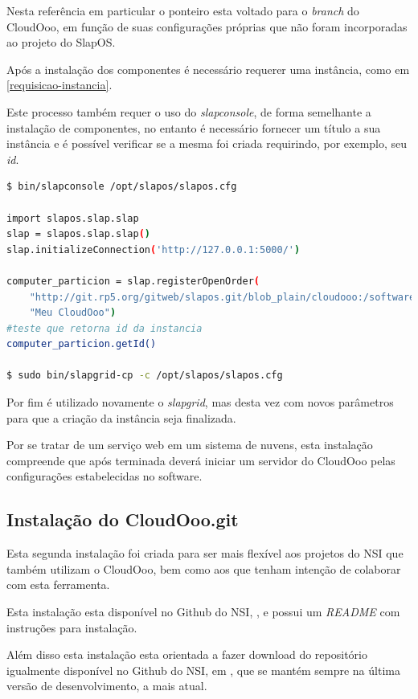 Nesta referência em particular o ponteiro esta voltado para o \textit{branch} do CloudOoo, em função de suas configurações próprias que não foram incorporadas ao projeto do SlapOS.

Após a instalação dos componentes é necessário requerer uma instância, como em \ref{requisicao-instancia}.

Este processo também requer o uso do \textit{slapconsole}, de forma semelhante a instalação de componentes, no entanto é necessário fornecer um título a sua instância e é possível verificar se a mesma foi criada requirindo, por exemplo, seu \textit{id}.

{\singlespace
\begin{lstlisting}[caption=Requisição de uma instância do CloudOoo via SlapOS,language=bash,label={requisicao-instancia}]
$ bin/slapconsole /opt/slapos/slapos.cfg

import slapos.slap.slap
slap = slapos.slap.slap()
slap.initializeConnection('http://127.0.0.1:5000/')

computer_particion = slap.registerOpenOrder(
    "http://git.rp5.org/gitweb/slapos.git/blob_plain/cloudooo:/software/cloudooo/software.cfg",
    "Meu CloudOoo")
#teste que retorna id da instancia
computer_particion.getId()

$ sudo bin/slapgrid-cp -c /opt/slapos/slapos.cfg

\end{lstlisting}
}

Por fim é utilizado novamente o \textit{slapgrid}, mas desta vez com novos parâmetros para que a criação da instância seja finalizada.

Por se tratar de um serviço web em um sistema de nuvens, esta instalação compreende que após terminada deverá iniciar um servidor do CloudOoo pelas configurações estabelecidas no software.


\subsection{Instalação do CloudOoo.git}
\label{clougit}

Esta segunda instalação foi criada para ser mais flexível aos projetos do NSI que também utilizam o CloudOoo, bem como aos que tenham intenção de colaborar com esta ferramenta. 

Esta instalação esta disponível no Github do NSI, \cite{BUILD-CLOUDOOO}, e possui um \textit{README} com instruções para instalação. 

Além disso esta instalação esta orientada a fazer download do repositório igualmente disponível no Github do NSI, em \cite{NSI-CLOUDOOO}, que se mantém sempre na última versão de desenvolvimento, a mais atual.

